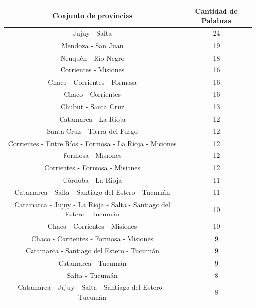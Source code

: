 \begin{table}
\centering

\begin{tabular}{|c|c|}
\hline
Conjunto de provincias                                 & Cantidad de Palabras  \\ \hline
Jujuy - Salta                                          & 24          \\
Mendoza - San Juan                                    & 19          \\
Neuquén - Río Negro                                   & 18          \\
Corrientes - Misiones                                 & 16          \\
Chaco - Corrientes - Formosa                           & 16          \\
Chaco - Corrientes                                    & 16          \\
Chubut - Santa Cruz                                   & 13          \\
Catamarca - La Rioja                                  & 12          \\
Santa Cruz - Tierra del Fuego                         & 12          \\
Corrientes - Entre Ríos - Formosa - La Rioja - Misiones  & 12          \\  %
Formosa - Misiones                                    & 12          \\
Corrientes - Formosa - Misiones                        & 12          \\
Córdoba - La Rioja                                    & 11          \\
Catamarca - Salta - Santiago del Estero - Tucumán       & 11          \\
Catamarca - Jujuy - La Rioja - Salta - Santiago del Estero - Tucumán & 10          \\
Chaco - Corrientes - Misiones                          & 10          \\
Chaco - Corrientes - Formosa - Misiones                 & 9           \\
Catamarca - Santiago del Estero - Tucumán              & 9           \\
Catamarca - Tucumán                                   & 9           \\
Salta - Tucumán                                       & 8           \\
Catamarca - Jujuy - Salta - Santiago del Estero - Tucumán& 8           \\

\end{tabular}
\end{table}
